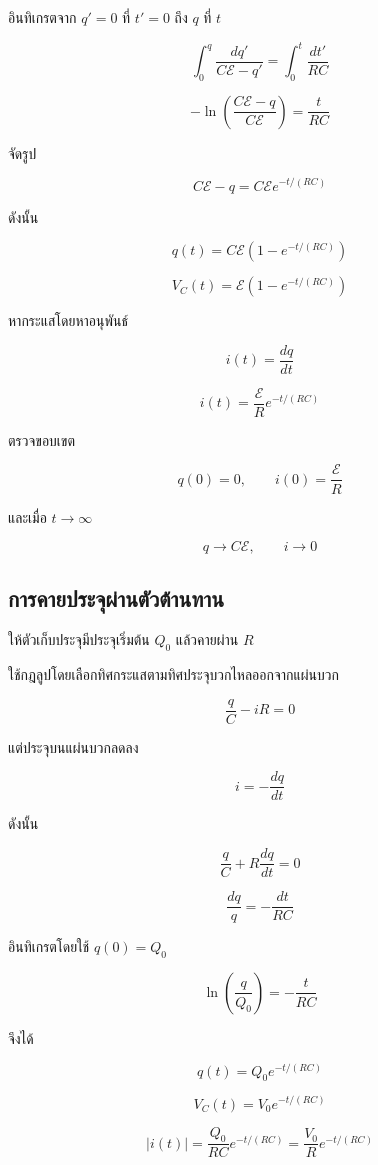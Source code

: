อินทิเกรตจาก $q'=0$ ที่ $t'=0$ ถึง $q$ ที่ $t$

\[
\int_0^q\frac{dq'}{C\mathcal{E}-q'}
=\int_0^t\frac{dt'}{RC}
\]

\[
-\ln\left(\frac{C\mathcal{E}-q}{C\mathcal{E}}\right)
=\frac{t}{RC}
\]

จัดรูป

\[
C\mathcal{E}-q=C\mathcal{E}e^{-t/(RC)}
\]

ดังนั้น

\begin{tcolorbox}[title={การชาร์จตัวเก็บประจุ}]
\[
\boxed{q(t)=C\mathcal{E}\left(1-e^{-t/(RC)}\right)}
\]

\[
\boxed{V_C(t)=\mathcal{E}\left(1-e^{-t/(RC)}\right)}
\]
\end{tcolorbox}

หากระแสโดยหาอนุพันธ์

\[
i(t)=\frac{dq}{dt}
\]

\[
\boxed{i(t)=\frac{\mathcal{E}}{R}e^{-t/(RC)}}
\]

ตรวจขอบเขต

\[
q(0)=0,\qquad i(0)=\frac{\mathcal{E}}{R}
\]

และเมื่อ $t\to\infty$

\[
q\to C\mathcal{E},\qquad i\to 0
\]

\subsection{การคายประจุผ่านตัวต้านทาน}

ให้ตัวเก็บประจุมีประจุเริ่มต้น $Q_0$ แล้วคายผ่าน $R$

ใช้กฎลูปโดยเลือกทิศกระแสตามทิศประจุบวกไหลออกจากแผ่นบวก

\[
\frac{q}{C}-iR=0
\]

แต่ประจุบนแผ่นบวกลดลง

\[
i=-\frac{dq}{dt}
\]

ดังนั้น

\[
\frac{q}{C}+R\frac{dq}{dt}=0
\]

\[
\frac{dq}{q}=-\frac{dt}{RC}
\]

อินทิเกรตโดยใช้ $q(0)=Q_0$

\[
\ln\left(\frac{q}{Q_0}\right)=-\frac{t}{RC}
\]

จึงได้

\begin{tcolorbox}[title={การคายประจุ}]
\[
\boxed{q(t)=Q_0e^{-t/(RC)}}
\]

\[
\boxed{V_C(t)=V_0e^{-t/(RC)}}
\]

\[
\boxed{|i(t)|=\frac{Q_0}{RC}e^{-t/(RC)}
=\frac{V_0}{R}e^{-t/(RC)}}
\]
\end{tcolorbox}

